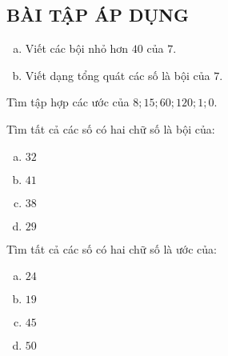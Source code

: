 \subsection{BÀI TẬP ÁP DỤNG}
\begin{bt} 
\begin{enumerate}[a)]
\item Viết các bội nhỏ hơn $40$ của $7$.
\item Viết dạng tổng quát các số là bội của $7$.
\end{enumerate}
\end{bt}   \begin{bt}
Tìm tập hợp  các ước của $8; 15; 60; 120; 1; 0$.
\newpage
\end{bt}   \begin{bt}
Tìm tất cả các số có hai chữ số là bội của:
\begin{multicols}{2}
\begin{enumerate}[a)]
\item $32$
\item $41$
\item $38$
\item $29$
\end{enumerate}
\end{multicols}
\end{bt}   \begin{bt}
Tìm tất cả các số có hai chữ số là ước của:
\begin{multicols}{2}
\begin{enumerate}[a)]
\item $24$
\item $19$
\item $45$
\item $50$
\end{enumerate}
\end{multicols}

\end{bt}
